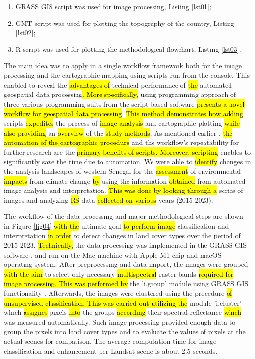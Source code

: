 \documentclass[earth,article,submit,pdftex,moreauthors]{Definitions/mdpi}
\begin{document}
 \begin{enumerate}
        \item GRASS GIS script was used for image processing, Listing \ref{lst01}; 
        \item GMT script was used for plotting the topography of the country, Listing \ref{lst02};  
        \item R script was used for plotting the methodological flowchart, Listing \ref{lst03}. 
  \end{enumerate}       

The main idea was to apply in a single workflow framework both for the image processing and the cartographic mapping using scripts run from the console. This enabled to reveal the \hl{advantages of }technical performance of \hl{the }automated geospatial data processing\hl{. More specifically, }using programming approach of three various programming suits from the script-based software \hl{presents a novel workflow for geospatial data processing}. \hl{This method demonstrates how adding} scripts \hl{expedites} the process of \hl{image analysis} and cartographic plotting \hl{while also providing} an \hl{overview} of the \hl{study methods}. As mentioned earlier \cite{Lemenkova202215}, \hl{the automation of the cartographic procedure} and the workflow's repeatability for further research are the \hl{primary benefits of scripts. Moreover, scripting} enables to significantly save the time due to automation. We were able to \hl{identify} changes in the analysis landscapes of western Senegal for the \hl{assessment} of environmental \hl{impacts} from climate change \hl{by} using the information \hl{obtained} from automated image analysis and interpretation. \hl{This was done by looking through a} series of images and analyzing \hl{RS} data \hl{collected on various} years (2015-2023). 

The workflow of the data processing and major methodological steps are shown in Figure \ref{fig04} \hl{with the} ultimate goal \hl{to perform image} classification and interpretation \hl{in order} to detect changes in land cover types over the period of 2015-2023. \hl{Technically, }the\hl{ }data processing was implemented in the GRASS GIS software \cite{NETELER2012124}, and run on the Mac machine with Apple M1 chip and macOS operating system. After preprocessing and data import, the images were grouped \hl{with the aim }to select only\hl{ }necessary \hl{multispectral }raster bands \hl{required for image processing. This was performed by} the 'i.group' module using GRASS GIS functionality \cite{NetelerMitasova2008}. Afterwards, the images were clustered using the\hl{ }procedure \hl{of unsupervised classification. This was carried out utilizing the} module 'i.cluster' which \hl{assignes} pixels \hl{into} the groups \hl{according} their spectral reflectance \hl{which} was measured automatically. Such image processing provided enough data to group the pixels into land cover types and to evaluate the values of pixels at the actual scenes for comparison. The average computation time for image classification and enhancement per Landsat scene is about 2.5 seconds.
\end{document}
